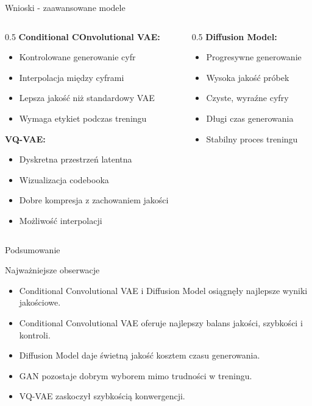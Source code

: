 \documentclass{beamer}
\begin{document}
\begin{frame}{Wnioski - zaawansowane modele}
    \begin{columns}[T]
        \begin{column}{0.5\textwidth}
            \textbf{Conditional COnvolutional VAE:}
            \begin{itemize}
                \item Kontrolowane generowanie cyfr
                \item Interpolacja między cyframi
                \item Lepsza jakość niż standardowy VAE
                \item Wymaga etykiet podczas treningu
            \end{itemize}

            \textbf{VQ-VAE:}
            \begin{itemize}
                \item Dyskretna przestrzeń latentna
                \item Wizualizacja codebooka
                \item Dobre kompresja z zachowaniem jakości
                \item Możliwość interpolacji
            \end{itemize}
        \end{column}
        \begin{column}{0.5\textwidth}
            \textbf{Diffusion Model:}
            \begin{itemize}
                \item Progresywne generowanie
                \item Wysoka jakość próbek
                \item Czyste, wyraźne cyfry
                \item Długi czas generowania
                \item Stabilny proces treningu
            \end{itemize}
        \end{column}
    \end{columns}
\end{frame}

\begin{frame}{Podsumowanie}
    \begin{block}{Najważniejsze obserwacje}
        \begin{itemize}
            \item Conditional Convolutional VAE i Diffusion Model osiągnęły najlepsze wyniki jakościowe.
            \item Conditional Convolutional VAE oferuje najlepszy balans jakości, szybkości i kontroli.
            \item Diffusion Model daje świetną jakość kosztem czasu generowania.
            \item GAN pozostaje dobrym wyborem mimo trudności w treningu.
            \item VQ-VAE zaskoczył szybkością konwergencji.
        \end{itemize}
    \end{block}

\end{frame}
\end{document}
